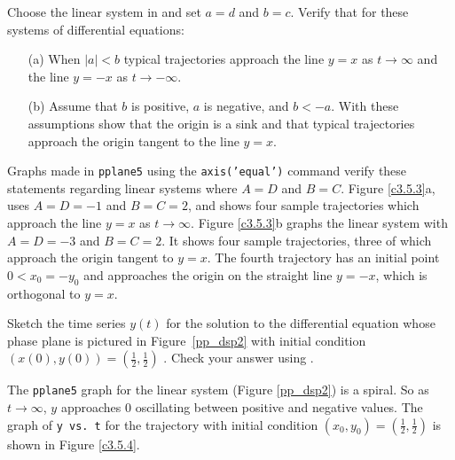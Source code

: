 \documentclass{ximera}
\begin{document}
\begin{exercise} \label{c3.5.3}
Choose the {\sf linear system} in {\pplane} and set
$a=d$ and $b=c$.  Verify that for these systems of differential
equations:
\begin{itemize}
\item[(a)]  When $|a|<b$ typical trajectories approach the line
$y=x$ as $t\to\infty$ and the line $y=-x$ as $t\to -\infty$.
\item[(b)]  Assume that $b$ is positive, $a$ is negative, and $b<-a$. 
With these assumptions show that the origin is a sink and that typical 
trajectories approach the origin tangent to the line $y=x$.
\end{itemize}

\begin{solution}

Graphs made in {\tt pplane5} using the {\tt axis('equal')} command
verify these statements regarding linear systems where $A = D$
and $B = C$.  Figure \ref{c3.5.3}a, uses $A = D = -1$ and
$B = C = 2$, and shows four sample trajectories which approach
the line $y = x$ as $t \rightarrow \infty$.  Figure
\ref{c3.5.3}b graphs the linear system with $A = D = -3$
and $B = C = 2$.  It shows four sample trajectories, three of
which approach the origin tangent to $y = x$.  The fourth
trajectory has an initial point $0 < x_0 = -y_0$ and approaches
the origin on the straight line $y = -x$, which is orthogonal
to $y = x$.
\begin{figure}[htb]
                       \centerline{%
                       }
\end{figure}

\end{solution}
\end{exercise}

\TEXER

\begin{exercise} \label{c3.5.4}
Sketch the time series $y(t)$ for the solution to the
differential equation whose phase plane is pictured in
Figure~\ref{pp_dsp2} with initial condition
$(x(0),y(0))=(\frac{1}{2},\frac{1}{2})$ .  Check your answer
using {\pplane}.

\begin{solution}

The {\tt pplane5} graph for the linear system (Figure \ref{pp_dsp2}) is
a spiral.  So as $t \rightarrow \infty$, $y$ approaches $0$ oscillating
between positive and negative values.  The graph of {\tt y vs.\ t} for the
trajectory with initial condition $(x_0,y_0) = \left(\frac{1}{2},
\frac{1}{2}\right)$ is shown in Figure \ref{c3.5.4}.

\begin{figure}[htb]
                       \centerline{%
                       }
\end{figure}

\end{solution}
\end{exercise}
\end{document}
